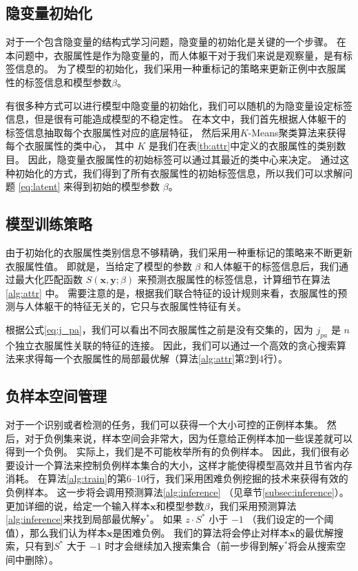 \subsection{隐变量初始化}
对于一个包含隐变量的结构式学习问题，隐变量的初始化是关键的一个步骤。
在本问题中，衣服属性是作为隐变量的，而人体躯干对于我们来说是观察量，是有标签信息的。
为了模型的初始化，我们采用一种重标记的策略来更新正例中衣服属性的标签信息和模型参数$\beta$。

有很多种方式可以进行模型中隐变量的初始化，我们可以随机的为隐变量设定标签信息，但是很有可能造成模型的不稳定性。
在本文中，我们首先根据人体躯干的标签信息抽取每个衣服属性对应的底层特征，
然后采用$K$-Means聚类算法来获得每个衣服属性的类中心，
其中 $K$ 是我们在表\ref{tb:attr}中定义的衣服属性的类别数目。
因此，隐变量衣服属性的初始标签可以通过其最近的类中心来决定。
通过这种初始化的方式，我们得到了所有衣服属性的初始标签信息，所以我们可以求解问题 \eqref{eq:latent} 来得到初始的模型参数 $\beta$。

\subsection{模型训练策略}
由于初始化的衣服属性类别信息不够精确，我们采用一种重标记的策略来不断更新衣服属性值。
即就是，当给定了模型的参数 $\beta$ 和人体躯干的标签信息后，我们通过最大化匹配函数 $S(\mathbf{x}, \mathbf{y}; \beta)$ 来预测衣服属性的标签信息，计算细节在算法 \ref{alg:attr} 中。
需要注意的是，根据我们联合特征的设计规则来看，衣服属性的预测与人体躯干的特征无关的，它只与衣服属性特征有关。

根据公式\eqref{eq:j_pa}，我们可以看出不同衣服属性之前是没有交集的，因为 $j_{pa}$ 是 $n$ 个独立衣服属性关联的特征的连接。
因此，我们可以通过一个高效的贪心搜索算法来求得每一个衣服属性的局部最优解（算法\ref{alg:attr}第2到4行）。


\subsection{负样本空间管理}
对于一个识别或者检测的任务，我们可以获得一个大小可控的正例样本集。
然后，对于负例集来说，样本空间会非常大，因为任意给正例样本加一些误差就可以得到一个负例。
实际上，我们是不可能枚举所有的负例样本。
因此，我们很有必要设计一个算法来控制负例样本集合的大小，这样才能使得模型高效并且节省内存消耗。
在算法\ref{alg:train}的第6--10行，我们采用困难负例挖掘\cite{dpm}的技术来获得有效的负例样本。
这一步将会调用预测算法\ref{alg:inference} （见章节\ref{subsec:inference}）。
更加详细的说，给定一个输入样本$\mathbf{x}$和模型参数$\beta$，我们采用预测算法\ref{alg:inference}来找到局部最优解$\mathbf{y}^*$。
如果 $z \cdot S^*$ 小于 $-1$ （我们设定的一个阈值），那么我们认为样本$\mathbf{x}$是困难负例。
我们的算法将会停止对样本$\mathbf{x}$的最优解搜索，只有到$S^*$ 大于 $-1$ 时才会继续加入搜索集合（前一步得到解$\mathbf{y}^*$将会从搜索空间中删除）。

